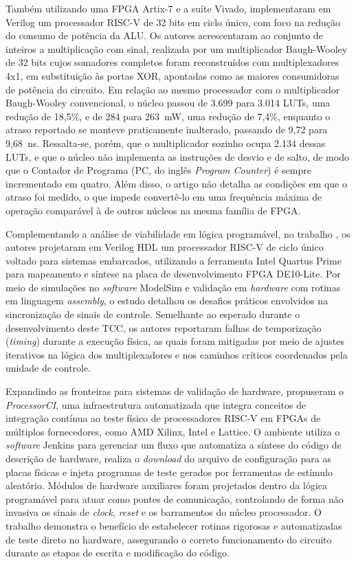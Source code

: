 Também utilizando uma FPGA Artix-7 e a suíte Vivado,  implementaram em Verilog um processador RISC-V de 32 bits em ciclo único, com foco na redução do consumo de potência da ALU. Os autores acrescentaram ao conjunto de inteiros a multiplicação com sinal, realizada por um multiplicador Baugh-Wooley de 32 bits cujos somadores completos foram reconstruídos com multiplexadores 4x1, em substituição às portas XOR, apontadas como as maiores consumidoras de potência do circuito. Em relação ao mesmo processador com o multiplicador Baugh-Wooley convencional, o núcleo passou de 3.699 para 3.014 LUTs, uma redução de 18,5\%, e de 284 para 263~mW, uma redução de 7,4\%, enquanto o atraso reportado se manteve praticamente inalterado, passando de 9,72 para 9,68~ns. Ressalta-se, porém, que o multiplicador sozinho ocupa 2.134 dessas LUTs, e que o núcleo não implementa as instruções de desvio e de salto, de modo que o Contador de Programa (PC, do inglês \textit{Program Counter}) é sempre incrementado em quatro. Além disso, o artigo não detalha as condições em que o atraso foi medido, o que impede convertê-lo em uma frequência máxima de operação comparável à de outros núcleos na mesma família de FPGA.

Complementando a análise de viabilidade em lógica programável, no trabalho , os autores projetaram em Verilog HDL um processador RISC-V de ciclo único voltado para sistemas embarcados, utilizando a ferramenta Intel Quartus Prime para mapeamento e síntese na placa de desenvolvimento FPGA DE10-Lite. Por meio de simulações no \textit{software} ModelSim e validação em \textit{hardware} com rotinas em linguagem \textit{assembly}, o estudo detalhou os desafios práticos envolvidos na sincronização de sinais de controle. Semelhante ao esperado durante o desenvolvimento deste TCC, os autores reportaram falhas de temporização (\textit{timing}) durante a execução física, as quais foram mitigadas por meio de ajustes iterativos na lógica dos multiplexadores e nos caminhos críticos coordenados pela unidade de controle.

Expandindo as fronteiras para sistemas de validação de hardware,  propuseram o \textit{ProcessorCI}, uma infraestrutura automatizada que integra conceitos de integração contínua ao teste físico de processadores RISC-V em FPGAs de múltiplos fornecedores, como AMD Xilinx, Intel e Lattice. O ambiente utiliza o \textit{software} Jenkins para gerenciar um fluxo que automatiza a síntese do código de descrição de hardware, realiza o \textit{download} do arquivo de configuração para as placas físicas e injeta programas de teste gerados por ferramentas de estímulo aleatório. Módulos de hardware auxiliares foram projetados dentro da lógica programável para atuar como pontes de comunicação, controlando de forma não invasiva os sinais de \textit{clock}, \textit{reset} e os barramentos do núcleo processador. O trabalho demonstra o benefício de estabelecer rotinas rigorosas e automatizadas de teste direto no hardware, assegurando o correto funcionamento do circuito durante as etapas de escrita e modificação do código.


